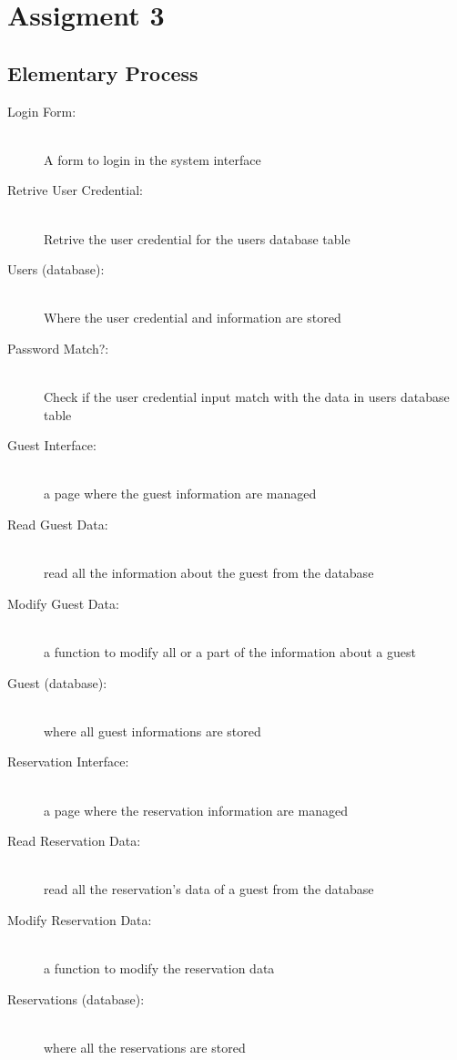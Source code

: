 \section{Assigment 3}



\subsection{Elementary Process}

\begin{description}
  
    \item[Login Form:] \hfill \\
      A form to login in the system interface
    \item[Retrive User Credential:] \hfill \\
      Retrive the user credential for the users database table
    \item[Users (database):] \hfill \\
      Where the user credential and information are stored
    \item[Password Match?:] \hfill \\
      Check if the user credential input match with the data in users database table

    \item[Guest Interface:] \hfill \\
      a page where the guest information are managed
    \item[Read Guest Data:] \hfill \\
      read all the information about the guest from the database
    \item[Modify Guest Data:] \hfill \\
      a function to modify all or a part of the information about a guest
    \item[Guest (database):] \hfill \\
      where all guest informations are stored

    \item[Reservation Interface:] \hfill \\
      a page where the reservation information are managed
    \item[Read Reservation Data:] \hfill \\
      read all the reservation’s data of a guest from the database
    \item[Modify Reservation Data:] \hfill \\
      a function to modify the reservation data
    \item[Reservations (database):] \hfill \\
      where all the reservations are stored


\end{description}
